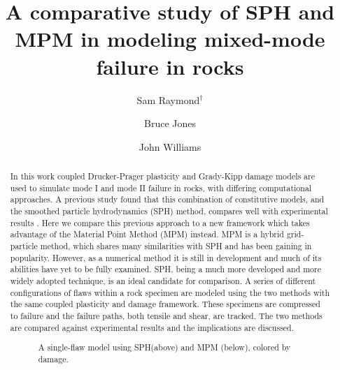 \documentclass[10pt]{article}
\title{A comparative study of SPH and MPM in modeling mixed-mode failure in rocks}
\date{}
\author[$\relax$]{Sam Raymond$^\dagger$}
\author[$\relax$]{Bruce Jones}
\author[$\relax$]{John Williams}
\affil[$\relax$]{Geonumerics Group, Department of Civil and Environmental Engineering, MIT, USA}
\affil[$\relax$]{\email{\dagger}{sjr@mit.edu}}
\begin{document}
\maketitle


\begin{abstract}
In this work coupled Drucker-Prager plasticity and Grady-Kipp damage models are used to simulate mode I and mode II failure in rocks, with differing computational approaches. A previous study found that this combination of constitutive models, and the smoothed particle hydrodynamics (SPH) method, compares well with experimental results \cite{douillet2016mixed}. Here we compare this previous approach to a new framework which takes advantage of the Material Point Method (MPM) instead. MPM is a hybrid grid-particle method, which shares many similarities with SPH and has been gaining in popularity. However, as a numerical method it is still in development and much of its abilities have yet to be fully examined. SPH, being a much more developed and more widely adopted technique, is an ideal candidate for comparison. A series of different configurations of flaws within a rock specimen are modeled using the two methods with the same coupled plasticity and damage framework. These specimens are compressed to failure and the failure paths, both tensile and shear, are tracked. The two methods are compared against experimental results and the implications are discussed.


\begin{figure}[!htb]
\centering
{}\hspace{1em}
\hspace{1em}

\vspace{1em}

\hspace{1em}
\hspace{1em}
\caption{A single-flaw model using SPH(above) and MPM (below), colored by damage.}\label{fig:4}
\end{figure}

\end{abstract}



\addbib
\end{document}
